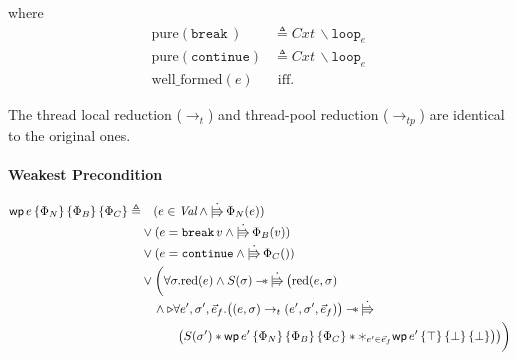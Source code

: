 \documentclass{article}
\numberwithin{algorithm}{section}
\newcommand{\progspec}[1]{\{ #1 \}}
\newcommand{\cloop}[1]{\texttt{loop}_{#1}\,}
\newcommand{\cbreak}{\texttt{break}\,}
\newcommand{\ccontinue}{\texttt{continue}}
\newcommand{\pure}[1]{\text{pure}(#1)}
\newcommand{\wellf}[1]{\text{well\_formed}(#1)}
\newcommand{\hred}{\rightarrow_h}
\newcommand{\tred}{\rightarrow_t}
\newcommand{\tpred}{\rightarrow_{tp}}
\newcommand{\cred}{\text{red}}
\newcommand{\wand}{-\mkern-8mu*\,}
\newcommand{\upd}{\dot{|\mkern-8mu\Rrightarrow}\,}
\newcommand{\later}{\triangleright}
\newcommand{\wpre}[4]{\textsf{wp}\, #1\, \progspec{#2}\, \progspec{#3}\, \progspec{#4}}
\newcommand{\sep}{\,|\,}
\begin{document}
where
$$
\begin{aligned}
    \pure{\cbreak\!} &\triangleq \textit{Cxt}\,\backslash\cloop{e} \\
    \pure{\ccontinue} &\triangleq \textit{Cxt}\,\backslash\cloop{e} \\
    \wellf{e} &\text{ iff. } %
    \end{aligned}
$$



The thread local reduction ($\tred$) and thread-pool reduction ($\tpred$) are identical to the original ones.


\paragraph{Weakest Precondition}

$$
\begin{aligned}
    \wpre{e}{\Phi_N}{\Phi_B}{\Phi_C} \triangleq& \quad
           (e \in \textit{Val} \land \upd \Phi_N(e)) \\
    & \lor (e = \cbreak v \land \upd \Phi_B(v)) \\
    & \lor (e = \ccontinue \land \upd \Phi_C()) \\
    & \lor \biggl(\forall \sigma. \cred(e) \land S(\sigma) \wand \upd \bigl(\cred(e, \sigma) \\
    & \quad \land \later
        \forall e', \sigma', \vec{e}_f. \bigl((e, \sigma) \tred (e', \sigma', \vec{e}_f)\bigr) \wand \upd \\
    & \quad\quad\quad \bigl(S(\sigma') * \wpre{e'}{\Phi_N}{\Phi_B}{\Phi_C} * \varhexstar_{e'\in\vec{e}_f} \wpre{e'}{\top}{\bot}{\bot} \bigr)\bigr)\biggr)
\end{aligned}
$$
\end{document}
